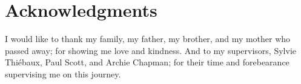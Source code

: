 \chapter*{Acknowledgments}
I would like to thank my family, my father, my brother, and my mother who passed away; for showing me love and kindness.
And to my supervisors, Sylvie Thi\'{e}baux, Paul Scott, and Archie Chapman; for their time and forebearance supervising me on this journey.


